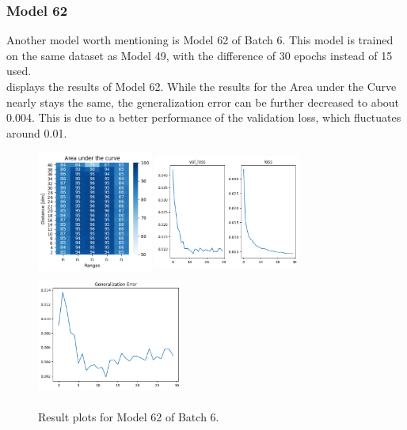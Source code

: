 \subsubsection{Model 62 \label{model_62}}
Another model worth mentioning is Model 62 of Batch 6. This model is trained on the same dataset as Model 49, with the difference of 30 epochs instead of 15 used.\\

 displays the results of Model 62. While the results for the Area under the Curve nearly stays the same, the generalization error can be further decreased to about 0.004. This is due to a better performance of the validation loss, which fluctuates around 0.01. 

\begin{figure}[H]%
\centering
\includegraphics[width=3.8cm, height=4cm]{4_plots/plots_62/AUC_62.png}
\hspace{0.2 cm}
\includegraphics[width=4.8cm, height=4cm]{3_models/models_62/graph_62.png}
\hspace{0.2 cm}
\includegraphics[width=4.8cm, height=4cm]{3_models/models_62/gen_loss_62.png}
\caption[]{Result plots for Model 62 of Batch 6.}
\label{best_model_62}
\end{figure}
